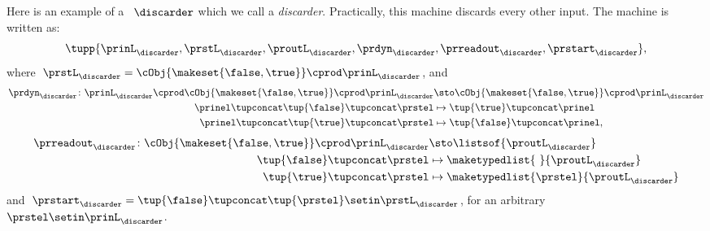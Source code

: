 \begin{example}[Discarder]
    Here is an example of a ~$\discarder$ which we call a \emph{discarder}.
    Practically, this machine discards every other input.
    The machine is written as:
    \begin{equation}
        \tupp{\prinL_{\discarder},\prstL_{\discarder},\proutL_{\discarder},\prdyn_{\discarder},\prreadout_{\discarder},\prstart_{\discarder}},
    \end{equation}
    where~$\prstL_{\discarder}= \cObj{\makeset{\false,\true}} \cprod \prinL_\discarder$, and
    \begin{equation}
        \begin{aligned}
            \prdyn_\discarder\colon \prinL_\discarder \cprod \cObj{\makeset{\false,\true}} \cprod \prinL_\discarder & \sto \cObj{\makeset{\false,\true}} \cprod \prinL_\discarder \\
            \prinel \tupconcat \tup{\false} \tupconcat \prstel                                                      & \mapsto \tup{\true} \tupconcat \prinel \\
            \prinel \tupconcat \tup{\true} \tupconcat \prstel                                                       & \mapsto\tup{\false} \tupconcat \prinel,
        \end{aligned}
    \end{equation}
    \begin{equation}
        \begin{aligned}
            \prreadout_\discarder\colon \cObj{\makeset{\false,\true}} \cprod \prinL_\discarder & \sto \listsof{\proutL_\discarder} \\
            \tup{\false} \tupconcat \prstel                                                    & \mapsto \maketypedlist{ \ }{\proutL_\discarder} \\
            \tup{\true} \tupconcat \prstel                                                     & \mapsto \maketypedlist{\prstel}{\proutL_\discarder}
        \end{aligned}
    \end{equation}
    and~$\prstart_\discarder = \tup{\false} \tupconcat \tup{\prstel} \setin \prstL_\discarder$, for an arbitrary~$\prstel\setin \prinL_\discarder$.
\end{example}


